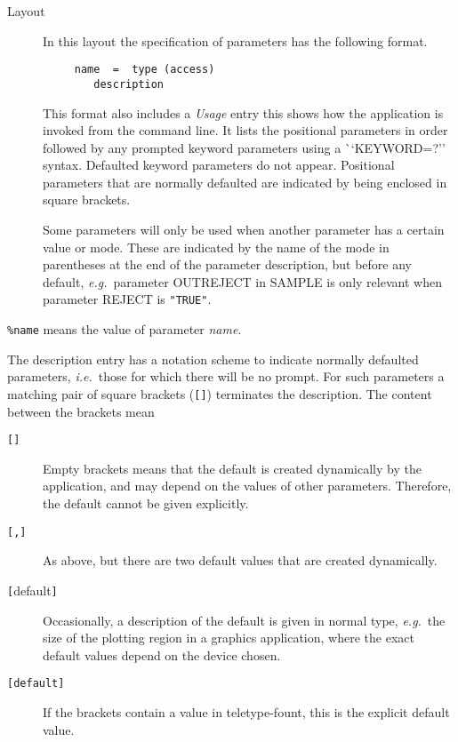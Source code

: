 \begin{description}

\item [Layout]
In this layout the specification of parameters has the following
format. 

\begin{verbatim}
     name  =  type (access)
        description
\end{verbatim}

This format also includes a {\em Usage} entry this shows how the
application is invoked from the command line.   It lists the positional
parameters in order followed by any prompted keyword parameters using 
a {\mbox ``KEYWORD=?''} syntax.  Defaulted
keyword parameters do not appear.  Positional parameters
that are normally defaulted are indicated by being enclosed in square
brackets.

Some parameters will only be used when another parameter has a certain
value or mode. These are indicated by the name of the mode in
parentheses at the end of the parameter description, but before any
default, {\it e.g.}\ parameter OUTREJECT in SAMPLE is only
relevant when parameter REJECT is {\tt "TRUE"}.

\end {description}

\newcommand {\mantt}{\tt}

{\mantt \%name} means the value of parameter {\it name}.

The description entry has a notation scheme to indicate 
normally defaulted parameters, {\it i.e.}\ those for which there will
be no prompt.
For such parameters a matching pair of square brackets ({\mantt []})
terminates the description.  The content between the brackets mean

\begin{description}

\item[{\mantt []}]
Empty brackets means that the default is created dynamically
by the application, and may depend on the values of other parameters.
Therefore, the default cannot be given explicitly.

\item[{\mantt [,]}]
As above, but there are two default values that are created dynamically.

\item[{\mantt [}{\rm default}{\mantt ]}]
Occasionally, a description of the default is given in normal type,
{\it e.g.}\ the size of the plotting region in a graphics application,
where the exact default values depend on the device chosen. 

\item[{\mantt [default]}]
If the brackets contain a value in teletype-fount, this is the explicit
default value.

\end{description}

